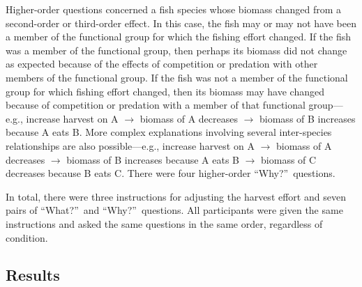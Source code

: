 Higher-order questions concerned a fish species whose biomass changed from a second-order or third-order effect.  In this case, the fish may or may not have been a member of the functional group for which the fishing effort changed.  If the fish was a member of the functional group, then perhaps its biomass did not change as expected because of the effects of competition or predation with other members of the functional group.  If the fish was not a member of the functional group for which fishing effort changed, then its biomass may have changed because of competition or predation with a member of that functional group---e.g., increase harvest on A $\rightarrow$ biomass of A decreases $\rightarrow$ biomass of B increases because A eats B.  More complex explanations involving several inter-species relationships are also possible---e.g., increase harvest on A $\rightarrow$ biomass of A decreases $\rightarrow$ biomass of B increases because A eats B $\rightarrow$ biomass of C decreases because B eats C.  There were four higher-order ``Why?''\ questions. 

In total, there were three instructions for adjusting the harvest effort and seven pairs of ``What?''\ and ``Why?''\ questions.  All participants were given the same instructions and asked the same questions in the same order, regardless of condition.

\subsection{Results}

